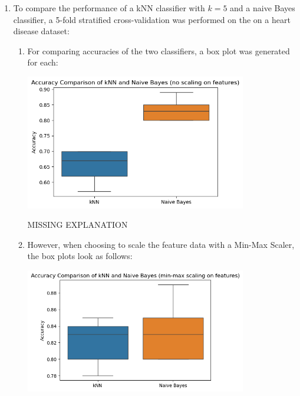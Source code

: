 \documentclass[12pt]{article}
\begin{document}
\begin{enumerate}[leftmargin=\labelsep, label=\textbf{\arabic*.)}]
    \item To compare the performance of a kNN classifier with $k=5$ and a naive Bayes classifier, a 5-fold stratified cross-validation was performed on the on a heart disease dataset:

          \begin{enumerate}[label=\textbf{\alph*.)}]
              \item For comparing accuracies of the two classifiers, a box plot was generated for each:

                    \begin{center}
                        \includegraphics[width=0.8\textwidth]{boxplot_accuracies_unscaled.png}
                    \end{center}
            
                \begin{large}
                MISSING EXPLANATION
                \end{large}
                
              \item However, when choosing to scale the feature data with a Min-Max Scaler, the box plots look as follows:

                    \begin{center}
                        \includegraphics[width=0.8\textwidth]{boxplot_accuracies_scaled.png}
                    \end{center}


\end{enumerate}
\end{enumerate}
\end{document}
